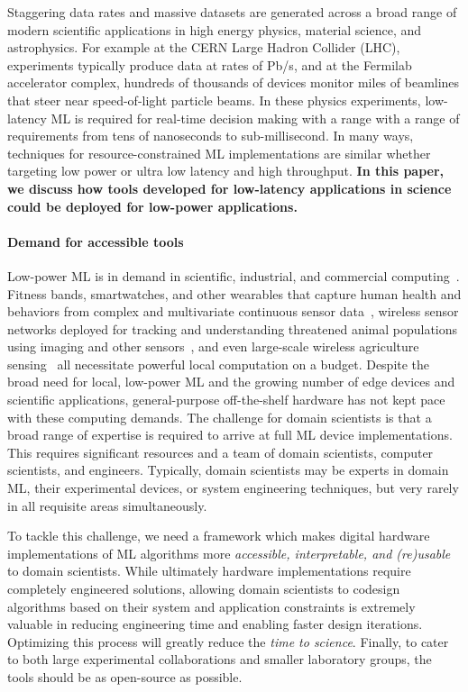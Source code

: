 \documentclass[tinyml]{acmart}
\begin{document}
Staggering data rates and massive datasets are generated across a broad range of modern scientific applications in high energy physics, material science, and astrophysics.
For example at the CERN Large Hadron Collider (LHC), experiments typically produce data at rates of Pb/s, and at the Fermilab accelerator complex, hundreds of thousands of devices monitor miles of beamlines that steer near speed-of-light particle beams.
In these physics experiments, low-latency ML is required for real-time decision making with a range
with a range of requirements from tens of nanoseconds to sub-millisecond.
In many ways, techniques for resource-constrained ML implementations are similar whether targeting low power or ultra low latency and high throughput.
\textbf{In this paper, we discuss how tools developed for low-latency applications in science could be deployed for low-power applications.}

\paragraph{\textbf{Demand for accessible tools}}
Low-power ML is in demand in scientific, industrial, and commercial computing~\cite{banbury2020benchmarking}.
Fitness bands, smartwatches, and other wearables that capture human health and behaviors from complex and multivariate continuous sensor data~\cite{zhang2020necksense}, wireless sensor networks deployed for tracking and understanding threatened animal populations using imaging and other sensors~\cite{elias2017s}, and even large-scale wireless agriculture sensing~\cite{vasisht2017farmbeats}
all necessitate powerful local computation on a budget.
Despite the broad need for local, low-power ML and the growing number of edge devices and scientific applications, general-purpose off-the-shelf hardware has not kept pace with these computing demands.
The challenge for domain scientists is that a broad range of expertise is required to arrive at full ML device implementations.
This requires significant resources and a team of domain scientists, computer scientists, and engineers.
Typically, domain scientists may be experts in domain ML, their experimental devices, or system engineering techniques, but very rarely in all requisite areas simultaneously.

To tackle this challenge, we need a framework which makes digital hardware implementations of ML algorithms more \textit{accessible, interpretable, and (re)usable} to domain scientists.
While ultimately hardware implementations require completely engineered solutions, allowing domain scientists to codesign algorithms based on their system and application constraints is extremely valuable in reducing engineering time and enabling faster design iterations.
Optimizing this process will greatly reduce the \textit{time to science}.
Finally, to cater to both large experimental collaborations and smaller laboratory groups, the tools should be as open-source as possible.
\end{document}
